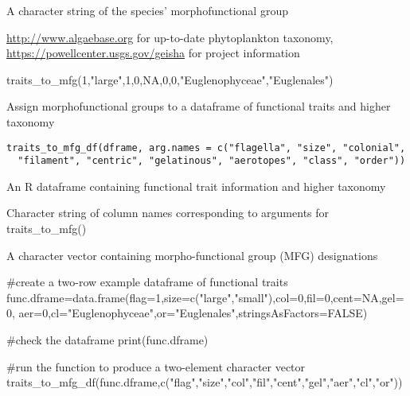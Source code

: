 \documentclass[a4paper]{book}
\begin{document}
%
\begin{Value}
A character string of the species' morphofunctional group
\end{Value}
%
\begin{SeeAlso}\relax
\url{http://www.algaebase.org} for up-to-date phytoplankton taxonomy,
\url{https://powellcenter.usgs.gov/geisha} for project information
\end{SeeAlso}
%
\begin{Examples}
\begin{ExampleCode}
traits_to_mfg(1,"large",1,0,NA,0,0,"Euglenophyceae","Euglenales")

\end{ExampleCode}
\end{Examples}
%
\begin{Description}\relax
Assign morphofunctional groups to a dataframe of functional traits and higher taxonomy
\end{Description}
%
\begin{Usage}
\begin{verbatim}
traits_to_mfg_df(dframe, arg.names = c("flagella", "size", "colonial",
  "filament", "centric", "gelatinous", "aerotopes", "class", "order"))
\end{verbatim}
\end{Usage}
%
\begin{Arguments}
\begin{ldescription}
\item[\code{dframe}] An R dataframe containing functional trait information and higher taxonomy

\item[\code{arg.names}] Character string of column names corresponding to arguments for traits\_to\_mfg()
\end{ldescription}
\end{Arguments}
%
\begin{Value}
A character vector containing morpho-functional group (MFG) designations
\end{Value}
%
\begin{Examples}
\begin{ExampleCode}
#create a two-row example dataframe of functional traits
func.dframe=data.frame(flag=1,size=c("large","small"),col=0,fil=0,cent=NA,gel=0,
                       aer=0,cl="Euglenophyceae",or="Euglenales",stringsAsFactors=FALSE)
                       
#check the dataframe                       
print(func.dframe)                        

#run the function to produce a two-element character vector
traits_to_mfg_df(func.dframe,c("flag","size","col","fil","cent","gel","aer","cl","or"))
\end{ExampleCode}
\end{Examples}
\end{document}

